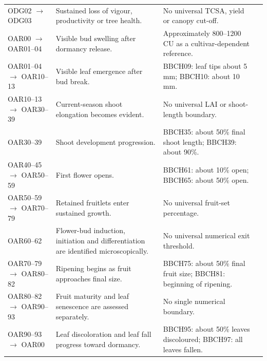 \begin{landscape}
\begin{longtable}{>{\RaggedRight\arraybackslash}p{5.0cm} >{\RaggedRight\arraybackslash}p{8.0cm} >{\RaggedRight\arraybackslash}p{10.0cm} >{\RaggedRight\arraybackslash}p{3.4cm}}
ODG02 $\rightarrow$ ODG03 &
Sustained loss of vigour, productivity or tree health. &
No universal TCSA, yield or canopy cut-off. &
\citep{ferree2003}\\

OAR00 $\rightarrow$ OAR01--04 &
Visible bud swelling after dormancy release. &
Approximately 800--1200 CU as a cultivar-dependent reference. &
\citep{gonzaleznoguer2023,parkes2020,meier1994}\\

OAR01--04 $\rightarrow$ OAR10--13 &
Visible leaf emergence after bud break. &
BBCH09: leaf tips about 5 mm; BBCH10: about 10 mm. &
\citep{meier1994}\\

OAR10--13 $\rightarrow$ OAR30--39 &
Current-season shoot elongation becomes evident. &
No universal LAI or shoot-length boundary. &
\citep{meier1994,wunsche1996}\\

OAR30--39 &
Shoot development progression. &
BBCH35: about 50\% final shoot length; BBCH39: about 90\%. &
\citep{meier1994,wang2020}\\

OAR40--45 $\rightarrow$ OAR50--59 &
First flower opens. &
BBCH61: about 10\% open; BBCH65: about 50\% open. &
\citep{meier1994}\\

OAR50--59 $\rightarrow$ OAR70--79 &
Retained fruitlets enter sustained growth. &
No universal fruit-set percentage. &
\citep{meier1994,serra2016}\\

OAR60--62 &
Flower-bud induction, initiation and differentiation are identified microscopically. &
No universal numerical exit threshold. &
\citep{kofler2019}\\

OAR70--79 $\rightarrow$ OAR80--82 &
Ripening begins as fruit approaches final size. &
BBCH75: about 50\% final fruit size; BBCH81: beginning of ripening. &
\citep{meier1994,malladi2010}\\

OAR80--82 $\rightarrow$ OAR90--93 &
Fruit maturity and leaf senescence are assessed separately. &
No single numerical boundary. &
\citep{meier1994}\\

OAR90--93 $\rightarrow$ OAR00 &
Leaf discoloration and leaf fall progress toward dormancy. &
BBCH95: about 50\% leaves discoloured; BBCH97: all leaves fallen. &
\citep{meier1994,gonzaleznoguer2023}\\


\end{longtable}
\end{landscape}
